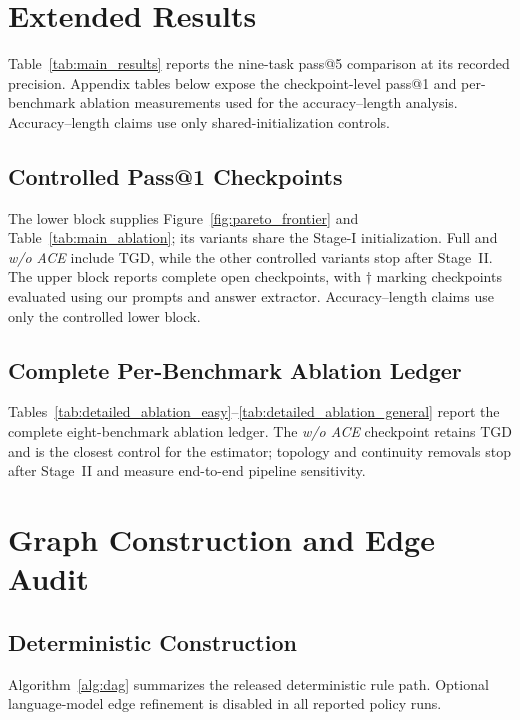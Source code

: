 \section{Extended Results}
\label{app:result_ledger}

Table~\ref{tab:main_results} reports the nine-task pass@5 comparison at its recorded precision. Appendix tables below expose the checkpoint-level pass@1 and per-benchmark ablation measurements used for the accuracy--length analysis. Accuracy--length claims use only shared-initialization controls.

\subsection{Controlled Pass@1 Checkpoints}


The lower block supplies Figure~\ref{fig:pareto_frontier} and Table~\ref{tab:main_ablation}; its variants share the Stage-I initialization. Full and \emph{w/o ACE} include TGD, while the other controlled variants stop after Stage~II. The upper block reports complete open checkpoints, with $\dagger$ marking checkpoints evaluated using our prompts and answer extractor. Accuracy--length claims use only the controlled lower block.

\subsection{Complete Per-Benchmark Ablation Ledger}
Tables~\ref{tab:detailed_ablation_easy}--\ref{tab:detailed_ablation_general} report the complete eight-benchmark ablation ledger. The \emph{w/o ACE} checkpoint retains TGD and is the closest control for the estimator; topology and continuity removals stop after Stage~II and measure end-to-end pipeline sensitivity.


\section{Graph Construction and Edge Audit}
\label{app:dag}

\subsection{Deterministic Construction}
Algorithm~\ref{alg:dag} summarizes the released deterministic rule path. Optional language-model edge refinement is disabled in all reported policy runs.

